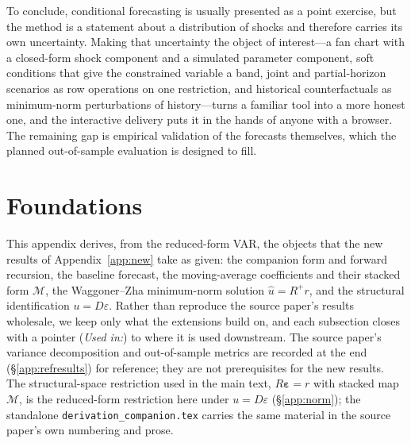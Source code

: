\documentclass[11pt]{article}
\newcommand{\eps}{\varepsilon}
\newcommand{\beps}{\bm{\varepsilon}}
\newcommand{\Mmap}{\mathcal{M}}
\newcommand{\pinv}[1]{#1^{+}}
\theoremstyle{remark}
\begin{document}
To conclude, conditional forecasting is usually presented as a point exercise, but
the method is a statement about a distribution of shocks and therefore carries its
own uncertainty. Making that uncertainty the object of interest---a fan chart with
a closed-form shock component and a simulated parameter component, soft conditions
that give the constrained variable a band, joint and partial-horizon scenarios as
row operations on one restriction, and historical counterfactuals as minimum-norm
perturbations of history---turns a familiar tool into a more honest one, and the
interactive delivery puts it in the hands of anyone with a browser. The remaining
gap is empirical validation of the forecasts themselves, which the planned
out-of-sample evaluation is designed to fill.

\appendix
\newpage
\section{Foundations}\label{app:orig}
This appendix derives, from the reduced-form VAR, the objects that the new results
of Appendix~\ref{app:new} take as given: the companion form and forward recursion,
the baseline forecast, the moving-average coefficients and their stacked form
$\Mmap$, the Waggoner--Zha minimum-norm solution $\hat u=\pinv{R}r$, and the
structural identification $u=D\eps$. Rather than reproduce the source paper's
results wholesale, we keep only what the extensions build on, and each subsection
closes with a pointer (\emph{Used in:}) to where it is used downstream. The source
paper's variance decomposition and out-of-sample metrics are recorded at the end
(\S\ref{app:refresults}) for reference; they are not prerequisites for the new
results. The structural-space restriction used in the main text, $R\beps=r$ with
stacked map $\Mmap$, is the reduced-form restriction here under $u=D\eps$
(\S\ref{app:norm}); the standalone \texttt{derivation\_companion.tex} carries the
same material in the source paper's own numbering and prose.

\medskip
\end{document}
